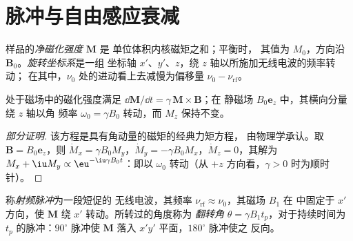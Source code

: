 \section{脉冲与自由感应衰减}

\begin{definition}\label{def:b3:advanced-nmr:magnetisation}
样品的\emph{净磁化强度} $\mathbf M$ 是
单位体积内核磁矩之和；平衡时，
其值为 $M_0$，方向沿 $\mathbf B_0$。\emph{旋转坐标系}是一组
坐标轴 $x'$、$y'$、$z$，绕 $z$ 轴以所施加无线电波的频率转动；
在其中，$\nu_0$ 处的进动看上去减慢为偏移量 $\nu_0 -
\nu_{\mathrm{rf}}$。
\end{definition}

\begin{proposition}[进动]\label{prop:b3:advanced-nmr:precession}
处于磁场中的磁化强度满足 $\dd\mathbf M/\dd t = \gamma\,\mathbf M\times\mathbf B$；在
静磁场 $B_0\mathbf e_z$ 中，其横向分量绕 $z$ 轴以角
频率 $\omega_0 = \gamma B_0$ 转动，而 $M_z$ 保持不变。
\end{proposition}

\begin{proof}[部分证明]
该方程是具有角动量的磁矩的经典力矩方程，
由物理学承认。取 $\mathbf B = B_0\mathbf e_z$，则 $\dot M_x = \gamma
B_0M_y$，$\dot M_y = -\gamma B_0M_x$，$\dot M_z = 0$，其解为 $M_x + \iu M_y \propto
\eu^{-\iu\gamma B_0t}$：即以 $\omega_0$ 转动（从 $+z$ 方向看，$\gamma > 0$ 时为顺时针）。
\end{proof}

\begin{definition}\label{def:b3:advanced-nmr:pulse}
称\emph{射频脉冲}为一段短促的
无线电波，其频率 $\nu_{\mathrm{rf}} \approx \nu_0$，其磁场 $B_1$ 在
中固定于 $x'$ 方向，使 $\mathbf M$ 绕 $x'$ 转动。所转过的角度称为
\emph{翻转角} $\theta = \gamma B_1t_p$，对于持续时间为
$t_p$ 的脉冲：$90^\circ$ 脉冲使 $\mathbf M$ 落入 $x'y'$ 平面，$180^\circ$ 脉冲使之
反向。
\end{definition}

